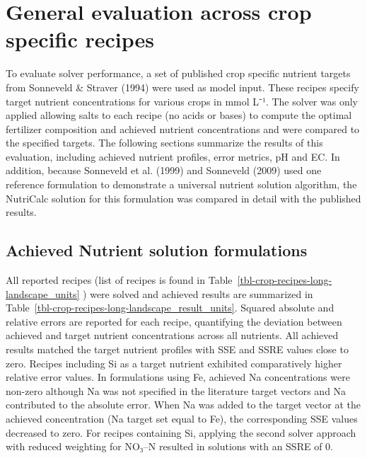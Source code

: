 \documentclass[
  letterpaper,
  DIV=11,
  numbers=noendperiod]{scrreprt}
\begin{document}
\section{General evaluation across crop specific
recipes}\label{general-evaluation-across-crop-specific-recipes}

To evaluate solver performance, a set of published crop specific
nutrient targets from Sonneveld \& Straver (1994) were used as model
input. These recipes specify target nutrient concentrations for various
crops in mmol L⁻¹. The solver was only applied allowing salts to each
recipe (no acids or bases) to compute the optimal fertilizer composition
and achieved nutrient concentrations and were compared to the specified
targets. The following sections summarize the results of this
evaluation, including achieved nutrient profiles, error metrics, pH and
EC. In addition, because Sonneveld et al. (1999) and Sonneveld (2009)
used one reference formulation to demonstrate a universal nutrient
solution algorithm, the NutriCalc solution for this formulation was
compared in detail with the published results.

\subsection{Achieved Nutrient solution
formulations}\label{achieved-nutrient-solution-formulations}

All reported recipes (list of recipes is found in
Table~\ref{tbl-crop-recipes-long-landscape_units} ) were solved and
achieved results are summarized in
Table~\ref{tbl-crop-recipes-long-landscape_result_units}. Squared
absolute and relative errors are reported for each recipe, quantifying
the deviation between achieved and target nutrient concentrations across
all nutrients. All achieved results matched the target nutrient profiles
with SSE and SSRE values close to zero. Recipes including Si as a target
nutrient exhibited comparatively higher relative error values. In
formulations using Fe, achieved Na concentrations were non-zero although
Na was not specified in the literature target vectors and Na contributed
to the absolute error. When Na was added to the target vector at the
achieved concentration (Na target set equal to Fe), the corresponding
SSE values decreased to zero. For recipes containing Si, applying the
second solver approach with reduced weighting for NO₃--N resulted in
solutions with an SSRE of 0.

\setlength{\LTpre}{-10pt}
\setlength{\LTpost}{0pt}
\renewcommand{\arraystretch}{0.85}
\end{document}
